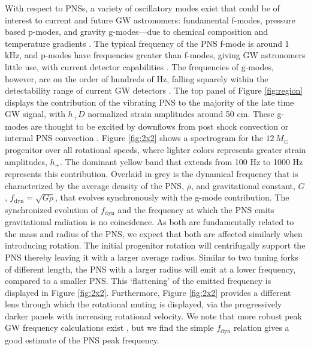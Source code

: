 \documentclass[twocolumn,times]{aastex62}  %
\begin{document}
 
With respect to PNSs, a variety of oscillatory modes exist that could be of interest to current and future GW astronomers: fundamental f-modes, pressure based p-modes, and gravity g-modes---due to chemical composition and temperature gradients \citep{unno:1989}.  The typical frequency of the PNS f-mode is around 1 kHz, and p-modes have frequencies greater than f-modes, giving GW astronomers little use, with current detector capabilities \citep{ho:2018}.  
The frequencies of g-modes, however, are on the order of hundreds of Hz, falling squarely within the detectability range of current GW detectors \citep{martynov:2016}.  
The top panel of Figure \ref{fig:region} displays the contribution of the vibrating PNS to the majority of the late time GW signal, with $h_+D$ normalized strain amplitudes around 50 cm.  
These g-modes are thought to be excited by downflows from post shock convection or internal PNS convection \citep{murphy:2009,marek:2009b,muller:2013}.  
Figure \ref{fig:2x2} shows a spectrogram for the $12 \, M_\odot$ progenitor over all rotational speeds, where lighter colors represents greater strain amplitudes, $h_+$.  The dominant yellow band that extends from 100 Hz to 1000 Hz represents this contribution.  
Overlaid in grey is the dynamical frequency that is characterized by the average density of the PNS, $\overline{\rho}$, and gravitational constant, $G$, $f_\mathrm{dyn} = \sqrt{G \overline{\rho}}$,  that evolves synchronously with the g-mode contribution.  The synchronized evolution of $f_\mathrm{dyn}$ and the frequency at which the PNS emits gravitational radiation is no coincidence.  As both are fundamentally related to the mass and radius of the PNS, we expect that both are affected similarly when introducing rotation.  The initial progenitor rotation will centrifugally support the PNS thereby leaving it with a larger average radius.  Similar to two tuning forks of different length, the PNS with a larger radius will emit at a lower frequency, compared to a smaller PNS.  This `flattening' of the emitted frequency is displayed in Figure \ref{fig:2x2}.  Furthermore, Figure \ref{fig:2x2} provides a different lens through which the rotational muting is displayed, via the progressively darker panels with increasing rotational velocity.  We note that more robust peak GW frequency calculations exist \citep[e.g.,][]{muller:2013,moro:2018}, but we find the simple $f_\mathrm{dyn}$ relation gives a good estimate of the PNS peak frequency.
\end{document}

